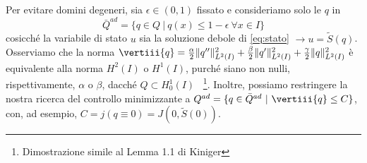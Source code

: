 Per evitare domini degeneri, sia $\epsilon\in (0,1)$ fissato e consideriamo solo le $q$ in
\begin{equation*}
\bar{Q}^{ad} = \{q\in Q\ |\ q(x)\leq 1-\epsilon\ \forall x\in I\}
\end{equation*}
cosicch\'e la variabile di stato $u$ sia la soluzione debole di \eqref{eq:stato} $\rightarrow u=\tilde{S}(q)$.\\
Osserviamo che la norma $\vertiii{q}= \frac{\alpha}{2}\|q''\|^2_{L^2(I)}+\frac{\beta}{2}\|q'\|^2_{L^2(I)}+\frac{\gamma}{2}\|q\|^2_{L^2(I)}$ \`e equivalente alla norma $H^2(I)$ o $H^1(I)$, purch\'e siano non nulli, rispettivamente, $\alpha$ o $\beta$, dacch\'e $Q\subset H^1_0(I)$ \  \footnote{Dimostrazione simile al Lemma 1.1 di Kiniger}. Inoltre, possiamo restringere la nostra ricerca del controllo minimizzante a $Q^{ad} = \{q\in \bar{Q}^{ad}\ |\ \vertiii{q} \leq C\}$, con, ad esempio, $C = j(q\equiv0)=J(0,\tilde{S}(0))$.

